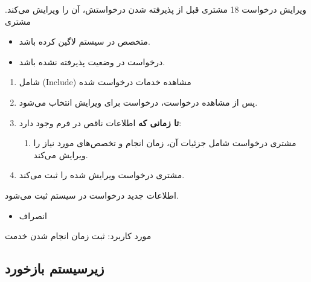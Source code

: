 {
	\usecase
	{ویرایش درخواست}
	{18}
	{مشتری قبل از پذیرفته شدن درخواستش، آن را ویرایش می‌کند.}
	{مشتری}
	{}
	{
		
		\begin{itemize}
			\item
			متخصص در سیستم لاگین کرده باشد.
			
			\item 
			درخواست در وضعیت پذیرفته نشده باشد.
			
		\end{itemize}	
		
		
	}
	{
		\vspace*{-0.6cm}
		\begin{enumerate}
			\item
				شامل (Include) مشاهده خدمات درخواست‌ شده
				
				\item
				پس از مشاهده درخواست، درخواست برای ویرایش انتخاب می‌شود.
				
				\item 
				\textbf{تا زمانی که}
				اطلاعات ناقص در فرم وجود دارد:
				\begin{enumerate}[label=\theenumi.\arabic*.]
					\item 
	مشتری درخواست شامل جزئیات آن، زمان انجام و تخصص‌های مورد نیاز را ویرایش می‌کند.
				\end{enumerate}
				\item 
			مشتری درخواست ویرایش شده را ثبت می‌کند.
				
			
		\end{enumerate}
	}
	{اطلاعات جدید درخواست در سیستم ثبت می‌شود.}
	{
		\begin{itemize}
			\vspace*{-0.6cm}
			\item انصراف
		\end{itemize}
	}
	{
		مورد کاربرد: ثبت زمان انجام شدن خدمت
	}
	
}



\newpage

\subsection{زیرسیستم بازخورد}

